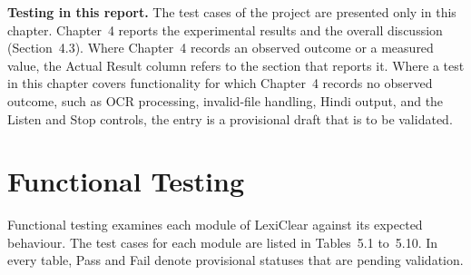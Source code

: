\documentclass[12pt,a4paper,oneside]{report}
\begin{document}
\textbf{Testing in this report.} The test cases of the project are presented only in this chapter. Chapter~4 reports the experimental results and the overall discussion (Section~4.3). Where Chapter~4 records an observed outcome or a measured value, the Actual Result column refers to the section that reports it. Where a test in this chapter covers functionality for which Chapter~4 records no observed outcome, such as OCR processing, invalid-file handling, Hindi output, and the Listen and Stop controls, the entry is a provisional draft that is to be validated.

\section{Functional Testing}
Functional testing examines each module of LexiClear against its expected behaviour. The test cases for each module are listed in Tables~5.1 to~5.10. In every table, Pass and Fail denote provisional statuses that are pending validation.
\end{document}
